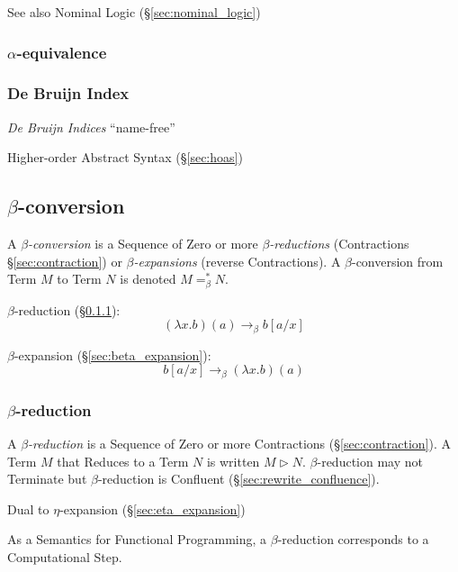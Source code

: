 \fist See also Nominal Logic (\S\ref{sec:nominal_logic})



\subsubsection{$\alpha$-equivalence}\label{sec:alpha_equivalence}

\subsubsection{De Bruijn Index}\label{sec:debruijn_index}

\emph{De Bruijn Indices} ``name-free''

Higher-order Abstract Syntax (\S\ref{sec:hoas})



\subsection{$\beta$-conversion}\label{sec:beta_conversion}
\cite{seldin03}

A \emph{$\beta$-conversion} is a Sequence of Zero or more
\emph{$\beta$-reductions} (Contractions \S\ref{sec:contraction}) or
\emph{$\beta$-expansions} (reverse Contractions). A $\beta$-conversion
from Term $M$ to Term $N$ is denoted $M =_\beta^* N$.

$\beta$-reduction (\S\ref{sec:beta_reduction}):
\[
  (\lambda x.b)(a) \rightarrow_\beta b[a/x]
\]

$\beta$-expansion (\S\ref{sec:beta_expansion}):
\[
  b[a/x] \rightarrow_\beta (\lambda x.b)(a)
\]




\subsubsection{$\beta$-reduction}\label{sec:beta_reduction}

A \emph{$\beta$-reduction} is a Sequence of Zero or more Contractions
(\S\ref{sec:contraction}). A Term $M$ that Reduces to a Term $N$ is
written $M \rhd N$. $\beta$-reduction may not Terminate but
$\beta$-reduction is Confluent (\S\ref{sec:rewrite_confluence}).

Dual to $\eta$-expansion (\S\ref{sec:eta_expansion})

As a Semantics for Functional Programming, a $\beta$-reduction
corresponds to a Computational Step.

